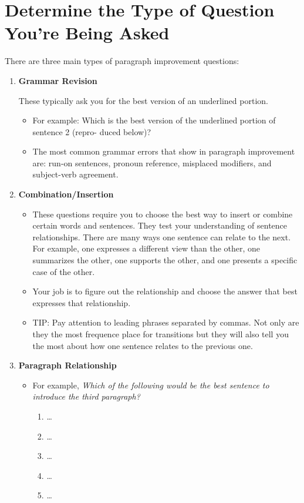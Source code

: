 \section{Determine the Type of Question You're Being Asked}

There are three main types of paragraph improvement questions:

\begin{enumerate}
\item{\large{\textbf{Grammar Revision}}}

These typically ask you for the best version of an underlined portion. 

\begin{itemize}
\item{For example: Which is the best version of the underlined portion of sentence 2 (repro-
duced below)?}

\item{The most common grammar errors that show in paragraph improvement are: run-on sentences, pronoun reference, misplaced modifiers, and subject-verb agreement.}
\end{itemize}

\item{\large{\textbf{Combination/Insertion}}}

\begin{itemize}
\item These questions require you to choose the best way to insert or combine certain words and
sentences. They test your understanding of sentence relationships. There are many ways
one sentence can relate to the next. For example, one expresses a different view than the
other, one summarizes the other, one supports the other, and one presents a specific case of
the other.


\item Your job is to figure out the relationship and choose the answer that best expresses that
relationship.

\item{TIP: Pay attention to leading phrases separated by commas. Not only are they the
most frequence place for transitions but they will also tell you the most about how one
sentence relates to the previous one.}
\end{itemize}

\item{\large{\textbf{Paragraph Relationship}}}

\begin{itemize}
\item{For example,}
\textit{Which of the following would be the best sentence to introduce the third paragraph?}

\begin{enumerate}[label=(\Alph*)]
\item\ldots
\item\ldots
\item\ldots
\item\ldots
\item\ldots
\end{enumerate}
\end{itemize}
\end{enumerate}

